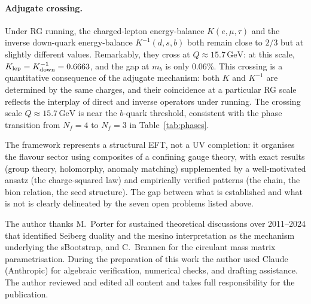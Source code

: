 \documentclass[aps,prd,twocolumn,showpacs,preprintnumbers,superscriptaddress,floatfix]{revtex4-2}
\newcommand{\Nf}{N_{\!f}}
\newcommand{\GeV}{\,\mathrm{GeV}}
\begin{document}
\paragraph{Adjugate crossing.}
Under RG running, the charged-lepton energy-balance
$K(e,\mu,\tau)$ and the inverse down-quark energy-balance
$K^{-1}(d,s,b)$ both remain close to $2/3$ but at slightly
different values.
Remarkably, they cross at $Q \approx 15.7\GeV$: at this scale,
$K_{\rm lep} = K^{-1}_{\rm down} = 0.6663$, and the gap at
$m_b$ is only $0.06\%$.
This crossing is a quantitative consequence of the adjugate
mechanism: both $K$ and $K^{-1}$ are determined by the same
charges, and their coincidence at a particular RG scale reflects
the interplay of direct and inverse operators under running.
The crossing scale $Q \approx 15.7\GeV$ is near the $b$-quark
threshold, consistent with the phase transition from $\Nf = 4$
to $\Nf = 3$ in Table~\ref{tab:phases}.

The framework represents a structural EFT, not a UV completion:
it organises the flavour sector using composites of a confining
gauge theory, with exact results (group theory, holomorphy,
anomaly matching) supplemented by a well-motivated ansatz
(the charge-squared law) and empirically verified patterns
(the chain, the bion relation, the seed structure).
The gap between what is established and what is not is clearly
delineated by the seven open problems listed above.


\begin{acknowledgments}
The author thanks M.~Porter for sustained theoretical discussions
over 2011--2024 that identified Seiberg duality and the mesino
interpretation as the mechanism underlying the sBootstrap,
and C.~Brannen for the circulant mass matrix parametrisation.
During the preparation of this work the author used Claude
(Anthropic) for algebraic verification, numerical checks,
and drafting assistance.
The author reviewed and edited all content and takes full
responsibility for the publication.
\end{acknowledgments}

\end{document}
